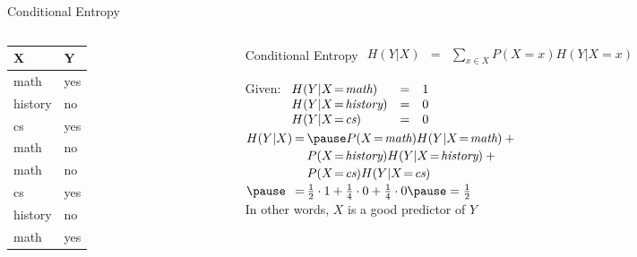 \documentclass[14pt]{beamer}
\begin{document}
\begin{frame}{Conditional Entropy}
	\begin{columns}
		\begin{column}{1.1in}
			\begin{tabular}{ll}
				X               & Y   \\
				\hline
				math            & yes \\
				history         & no  \\
				cs              & yes \\
				math            & no  \\
				math            & no  \\
				cs              & yes \\
				history         & no  \\
				math            & yes \\
			\end{tabular}
		\end{column}
		\begin{column}{3.1in}
			\begin{block}{Conditional Entropy}
				$
				\begin{array}{lll}
					H(Y|X) & = & \sum\limits_{x \in X}P(X\!=\!x)H(Y|X\!=\!x)
				\end{array}
				$
			\end{block}
			\pause
			\small
			Given:
			$
			\begin{array}[t]{lll}
			H(Y|X\!=\!\textit{math})    & = & 1 \\
			H(Y|X\!=\!\textit{history}) & = & 0 \\
			H(Y|X\!=\!\textit{cs})      & = & 0 \\
			\end{array}
			$ \\
			\smallskip
			\pause
			$
			\extrarowheight=2pt
			\begin{array}{@{}l@{\hspace{2pt}}l@{\hspace{2pt}}l@{}}
				H(Y|X) & = & \pause P(X\!=\!\textit{math}) H(Y|X\!=\!\textit{math}) + \mbox{}\\
				       &   & P(X\!=\!\textit{history}) H(Y|X\!=\!\textit{history}) + \mbox{}\\
				       &   & P(X\!=\!\textit{cs}) H(Y|X\!=\!\textit{cs}) \\
				\pause & = & \frac{1}{2} \cdot 1 + \frac{1}{4} \cdot 0 + \frac{1}{4} \cdot 0 \pause = \frac{1}{2}\\
				
			\end{array}
			$ \\
			\medskip
			\pause
			In other words, $X$ is a good predictor of $Y$
		\end{column}
	\end{columns}
\end{frame}
\end{document}
